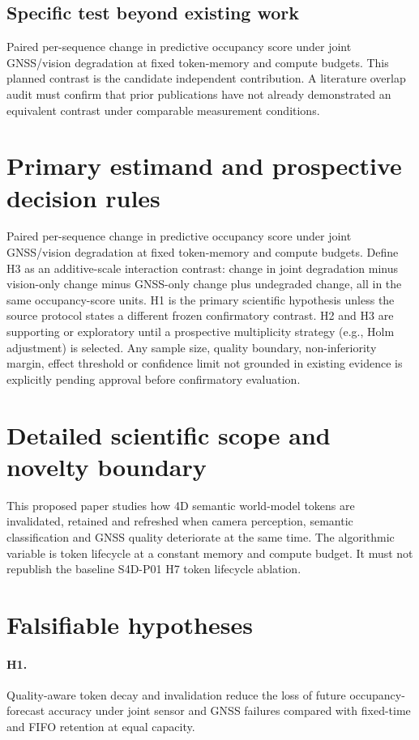 \documentclass[11pt,a4paper]{article}
\begin{document}
\subsection{Specific test beyond existing work}
Paired per-sequence change in predictive occupancy score under joint GNSS/vision degradation at fixed token-memory and compute budgets. This planned contrast is the candidate independent contribution. A literature overlap audit must confirm that prior publications have not already demonstrated an equivalent contrast under comparable measurement conditions.

\section{Primary estimand and prospective decision rules}
Paired per-sequence change in predictive occupancy score under joint GNSS/vision degradation at fixed token-memory and compute budgets. Define H3 as an additive-scale interaction contrast: change in joint degradation minus vision-only change minus GNSS-only change plus undegraded change, all in the same occupancy-score units. H1 is the primary scientific hypothesis unless the source protocol states a different frozen confirmatory contrast. H2 and H3 are supporting or exploratory until a prospective multiplicity strategy (e.g., Holm adjustment) is selected. Any sample size, quality boundary, non-inferiority margin, effect threshold or confidence limit not grounded in existing evidence is explicitly pending approval before confirmatory evaluation.

\section{Detailed scientific scope and novelty boundary}
This proposed paper studies how 4D semantic world-model tokens are invalidated, retained and refreshed when camera perception, semantic classification and GNSS quality deteriorate at the same time. The algorithmic variable is token lifecycle at a constant memory and compute budget. It must not republish the baseline S4D-P01 H7 token lifecycle ablation.

\section{Falsifiable hypotheses}
\paragraph{H1.} Quality-aware token decay and invalidation reduce the loss of future occupancy-forecast accuracy under joint sensor and GNSS failures compared with fixed-time and FIFO retention at equal capacity.
\end{document}
